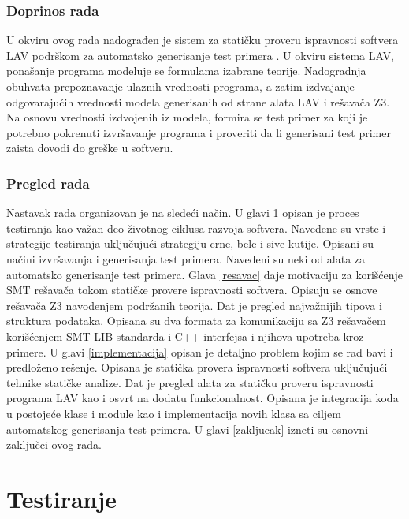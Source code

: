 \documentclass[12pt,oneside]{memoir}
\begin{document}
\subsection{Doprinos rada}

U okviru ovog rada nadograđen je sistem za statičku proveru ispravnosti softvera LAV podrškom za automatsko generisanje test primera \cite{LAVTool}. U okviru sistema
LAV, ponašanje programa modeluje se formulama izabrane teorije. Nadogradnja obuhvata prepoznavanje ulaznih vrednosti programa, a zatim izdvajanje odgovarajućih vrednosti modela generisanih od strane alata LAV i rešavača Z3. Na osnovu vrednosti izdvojenih iz modela, formira se test primer za koji je potrebno pokrenuti izvršavanje programa i proveriti da li generisani test primer zaista dovodi do greške u softveru.

\subsection{Pregled rada}
Nastavak rada organizovan je na sledeći način. U glavi \ref{testiranje} opisan je proces testiranja kao važan deo životnog ciklusa razvoja softvera. Navedene su vrste i strategije testiranja uključujući strategiju crne, bele i sive kutije. Opisani su načini izvršavanja i generisanja test primera. Navedeni su neki od alata za automatsko generisanje test primera. Glava \ref{resavac} daje motivaciju za korišćenje SMT rešavača tokom statičke provere ispravnosti softvera. Opisuju se osnove rešavača Z3 navođenjem podržanih teorija. Dat je pregled najvažnijih tipova i struktura podataka. Opisana su dva formata za komunikaciju sa Z3 rešavačem korišćenjem SMT-LIB standarda i C++ interfejsa i njihova upotreba kroz primere. U glavi \ref{implementacija} opisan je detaljno problem kojim se rad bavi i predloženo rešenje. Opisana je statička provera ispravnosti softvera uključujući tehnike statičke analize. Dat je pregled alata za statičku proveru ispravnosti programa LAV kao i osvrt na dodatu funkcionalnost. Opisana je integracija koda u postojeće klase i module kao i implementacija novih klasa sa ciljem automatskog generisanja test primera. U glavi \ref{zakljucak} izneti su osnovni zaključci ovog rada.



\chapter{Testiranje} \label{testiranje}
\end{document}
